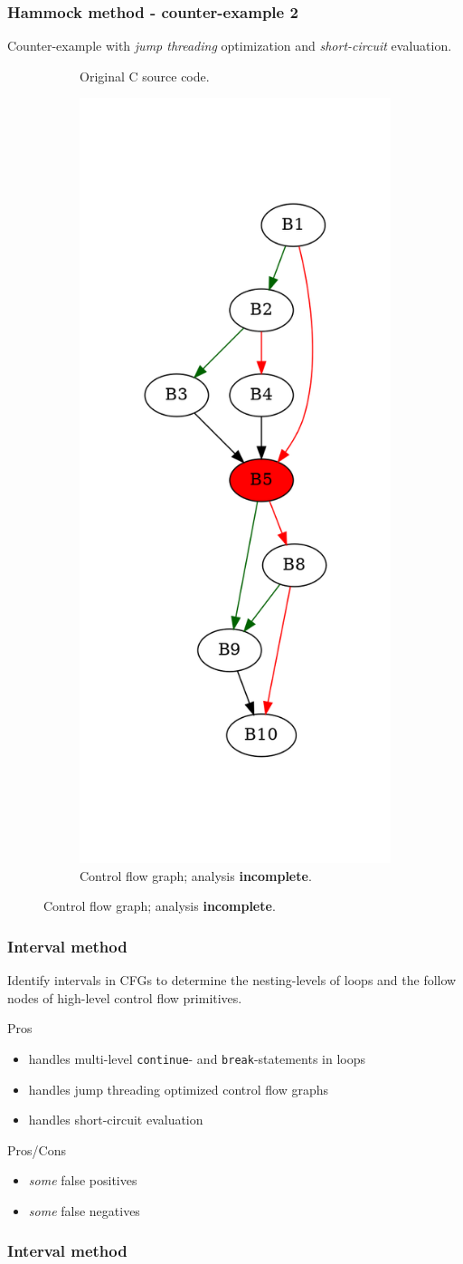 \documentclass[aspectratio=1610]{beamer}
\begin{document}
\begin{frame}[noframenumbering]
	\frametitle{Hammock method - counter-example 2}
	Counter-example with \textit{jump threading} optimization and \textit{short-circuit} evaluation.
	\begin{figure}[htbp]
		\centering
		\begin{subfigure}[b]{0.30\textwidth}
			\centering
			
			\caption{Original C source code.}
		\end{subfigure}
		\begin{subfigure}[b]{0.50\textwidth}
			\centering
			\includegraphics[height=0.7\paperheight]{inc/methods/hammock/counter-example/jump-threading-and-short-circuit/jump-threading-and-short-circuit_jump/f_0004b.png}
			\caption{Control flow graph; analysis \textbf{incomplete}.}
		\end{subfigure}
	\end{figure}
\end{frame}


\begin{frame}
	\frametitle{Interval method}

	Identify intervals in CFGs to determine the nesting-levels of loops and the follow nodes of high-level control flow primitives.

	\vspace*{2em}

	\begin{block}{Pros}
		\begin{itemize}
			\item handles multi-level \texttt{continue}- and \texttt{break}-statements in loops
			\item handles jump threading optimized control flow graphs
			\item handles short-circuit evaluation
		\end{itemize}
	\end{block}

	\begin{block}{Pros/Cons}
		\begin{itemize}
			\item \textit{some} false positives
			\item \textit{some} false negatives
		\end{itemize}
	\end{block}

\end{frame}

\begin{frame}
	\frametitle{Interval method}
	\begin{figure}[htbp]
		\begin{subfigure}[ht]{0.50\textwidth}

\end{subfigure}
\end{figure}
\end{frame}
\end{document}
